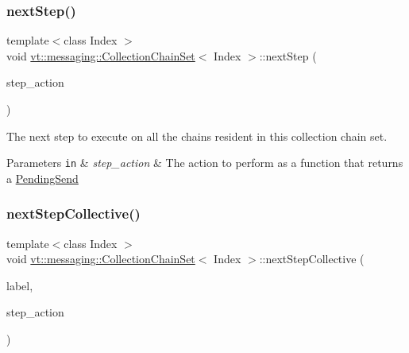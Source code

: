 \subsubsection{\texorpdfstring{next\+Step()}{nextStep()}\hspace{0.1cm}{\footnotesize\ttfamily [2/2]}}
{\footnotesize\ttfamily template$<$class Index $>$ \\
void \hyperlink{classvt_1_1messaging_1_1_collection_chain_set}{vt\+::messaging\+::\+Collection\+Chain\+Set}$<$ Index $>$\+::next\+Step (\begin{DoxyParamCaption}\item[{std\+::function$<$ \hyperlink{structvt_1_1messaging_1_1_pending_send}{Pending\+Send}(Index)$>$}]{step\+\_\+action }\end{DoxyParamCaption})\hspace{0.3cm}{\ttfamily [inline]}}



The next step to execute on all the chains resident in this collection chain set. 


\begin{DoxyParams}[1]{Parameters}
\mbox{\tt in}  & {\em step\+\_\+action} & The action to perform as a function that returns a {\ttfamily \hyperlink{structvt_1_1messaging_1_1_pending_send}{Pending\+Send}} \\
\hline
\end{DoxyParams}
\mbox{\label{classvt_1_1messaging_1_1_collection_chain_set_a095bc4907c3bd60668483de52b79b08e}} 
\subsubsection{\texorpdfstring{next\+Step\+Collective()}{nextStepCollective()}\hspace{0.1cm}{\footnotesize\ttfamily [1/2]}}
{\footnotesize\ttfamily template$<$class Index $>$ \\
void \hyperlink{classvt_1_1messaging_1_1_collection_chain_set}{vt\+::messaging\+::\+Collection\+Chain\+Set}$<$ Index $>$\+::next\+Step\+Collective (\begin{DoxyParamCaption}\item[{std\+::string const \&}]{label,  }\item[{std\+::function$<$ \hyperlink{structvt_1_1messaging_1_1_pending_send}{Pending\+Send}(Index)$>$}]{step\+\_\+action }\end{DoxyParamCaption})\hspace{0.3cm}{\ttfamily [inline]}}



